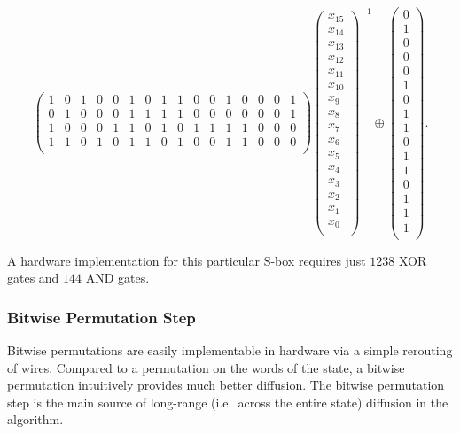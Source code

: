 \begin{equation*}
\begin{pmatrix}
1 & 0 & 1 & 0 & 0 & 1 & 0 & 1 & 1 & 0 & 0 & 1 & 0 & 0 & 0 & 1 \\
0 & 1 & 0 & 0 & 0 & 1 & 1 & 1 & 1 & 0 & 0 & 0 & 0 & 0 & 0 & 1 \\
1 & 0 & 0 & 0 & 1 & 1 & 0 & 1 & 0 & 1 & 1 & 1 & 1 & 0 & 0 & 0 \\
1 & 1 & 0 & 1 & 0 & 1 & 1 & 0 & 1 & 0 & 0 & 1 & 1 & 0 & 0 & 0 \\
\end{pmatrix}
\begin{pmatrix}
x_{15} \\
x_{14} \\
x_{13} \\
x_{12} \\
x_{11} \\
x_{10} \\
x_{9} \\
x_{8} \\
x_{7} \\
x_{6} \\
x_{5} \\
x_{4} \\
x_{3} \\
x_{2} \\
x_{1} \\
x_{0} \\
\end{pmatrix}
^{-1}
\oplus
\begin{pmatrix}
0 \\
1 \\
0 \\
0 \\
0 \\
1 \\
0 \\
1 \\
1 \\
0 \\
1 \\
1 \\
0 \\
1 \\
1 \\
1 \\
\end{pmatrix}.
\end{equation*}

A hardware implementation for this particular S-box requires just $1238$ XOR gates and $144$ AND gates.

\subsubsection{Bitwise Permutation Step}
Bitwise permutations are easily implementable in hardware via a simple rerouting of wires.
Compared to a permutation on the words of the state, a bitwise permutation intuitively provides much better diffusion.
The bitwise permutation step is the main source of long-range (i.e.\ across the entire state) diffusion in the algorithm.

